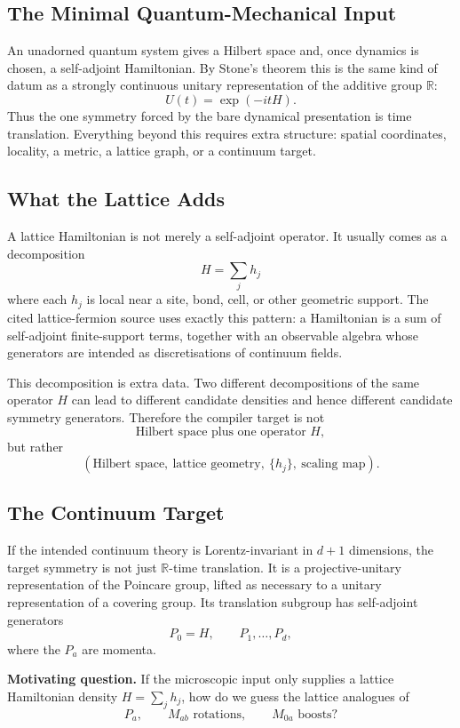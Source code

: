 \subsection{The Minimal Quantum-Mechanical Input}

An unadorned quantum system gives a Hilbert space and, once dynamics is chosen,
a self-adjoint Hamiltonian.  By Stone's theorem this is the same kind of datum as
a strongly continuous unitary representation of the additive group
\(\mathbb R\):
\[
  U(t)=\exp(-itH).
\]
Thus the one symmetry forced by the bare dynamical presentation is time
translation.  Everything beyond this requires extra structure: spatial
coordinates, locality, a metric, a lattice graph, or a continuum target.

\subsection{What the Lattice Adds}

A lattice Hamiltonian is not merely a self-adjoint operator.  It usually comes
as a decomposition
\[
  H=\sum_j h_j
\]
where each \(h_j\) is local near a site, bond, cell, or other geometric support.
The cited lattice-fermion source uses exactly this pattern: a Hamiltonian is a
sum of self-adjoint finite-support terms, together with an observable algebra
whose generators are intended as discretisations of continuum fields.

This decomposition is extra data.  Two different decompositions of the same
operator \(H\) can lead to different candidate densities and hence different
candidate symmetry generators.  Therefore the compiler target is not
\[
  \text{Hilbert space plus one operator }H,
\]
but rather
\[
  (\text{Hilbert space},\ \text{lattice geometry},\ \{h_j\},\ \text{scaling map}).
\]

\subsection{The Continuum Target}

If the intended continuum theory is Lorentz-invariant in \(d+1\) dimensions, the
target symmetry is not just \(\mathbb R\)-time translation.  It is a
projective-unitary representation of the Poincare group, lifted as necessary to
a unitary representation of a covering group.  Its translation subgroup has
self-adjoint generators
\[
  P_0=H,\qquad P_1,\ldots,P_d,
\]
where the \(P_a\) are momenta.

\textbf{Motivating question.}  If the microscopic input only supplies a lattice
Hamiltonian density \(H=\sum_j h_j\), how do we guess the lattice analogues of
\[
  P_a,\qquad M_{ab}\text{ rotations},\qquad M_{0a}\text{ boosts}?
\]

